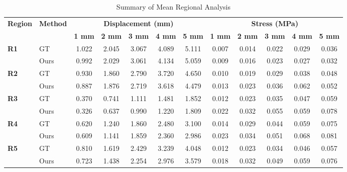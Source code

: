 \documentclass{article}
\begin{document}
\thispagestyle{empty}

\begin{table}[h]
\centering
\caption{Summary of Mean Regional Analysis}
\vspace{0.3cm}
\begin{tabular}{llcccccccccc}
\toprule
\multirow{2}{*}{\textbf{Region}} & \multirow{2}{*}{\textbf{Method}} & \multicolumn{5}{c}{\textbf{Displacement (mm)}} & \multicolumn{5}{c}{\textbf{Stress (MPa)}} \\
\cmidrule(lr){3-7} \cmidrule(lr){8-12}
& & \textbf{1 mm} & \textbf{2 mm} & \textbf{3 mm} & \textbf{4 mm} & \textbf{5 mm} & \textbf{1 mm} & \textbf{2 mm} & \textbf{3 mm} & \textbf{4 mm} & \textbf{5 mm} \\
\midrule
\multirow{2}{*}{\textbf{R1}} & GT  & 1.022 & 2.045 & 3.067 & 4.089 & 5.111 & 0.007 & 0.014 & 0.022 & 0.029 & 0.036 \\
 & Ours  & 0.992 & 2.029 & 3.061 & 4.134 & 5.059 & 0.009 & 0.016 & 0.023 & 0.027 & 0.032 \\ \midrule
\multirow{2}{*}{\textbf{R2}} & GT  & 0.930 & 1.860 & 2.790 & 3.720 & 4.650 & 0.010 & 0.019 & 0.029 & 0.038 & 0.048 \\
 & Ours  & 0.887 & 1.876 & 2.719 & 3.618 & 4.479 & 0.013 & 0.023 & 0.036 & 0.062 & 0.052 \\ \midrule
\multirow{2}{*}{\textbf{R3}} & GT  & 0.370 & 0.741 & 1.111 & 1.481 & 1.852 & 0.012 & 0.023 & 0.035 & 0.047 & 0.059 \\
 & Ours  & 0.326 & 0.637 & 0.990 & 1.220 & 1.809 & 0.022 & 0.032 & 0.055 & 0.059 & 0.078 \\ \midrule
\multirow{2}{*}{\textbf{R4}} & GT  & 0.620 & 1.240 & 1.860 & 2.480 & 3.100 & 0.014 & 0.029 & 0.044 & 0.059 & 0.075 \\
 & Ours  & 0.609 & 1.141 & 1.859 & 2.360 & 2.986 & 0.023 & 0.034 & 0.051 & 0.068 & 0.081 \\ \midrule
\multirow{2}{*}{\textbf{R5}} & GT  & 0.810 & 1.619 & 2.429 & 3.239 & 4.048 & 0.012 & 0.023 & 0.034 & 0.046 & 0.057 \\
 & Ours  & 0.723 & 1.438 & 2.254 & 2.976 & 3.579 & 0.018 & 0.032 & 0.049 & 0.059 & 0.076 \\
\bottomrule
\end{tabular}
\end{table}
\end{document}
